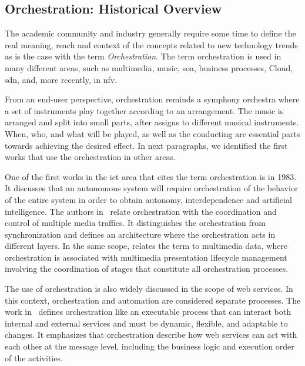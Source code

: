 \subsection{Orchestration: Historical Overview}



The academic community and industry generally require some time to define the real meaning, reach and context of the concepts related to new technology trends as is the case with the term \textit{Orchestration}. 
The term orchestration is used in many different areas, such as multimedia, music, \gls{soa}, business processes, Cloud, \gls{sdn}, and, more recently, in \gls{nfv}.


From an end-user perspective, orchestration reminds a symphony orchestra where a set of instruments play together according to an arrangement. The music is arranged and split into small parts, after assigns to different musical instruments. When, who, and what will be played, as well as the conducting are essential parts towards achieving the desired effect. In next paragraphs, we identified the first works that use the orchestration in other areas. 

One of the first works in the \gls{ict} area that cites the term orchestration is \cite{Anderson1983} in 1983. It discusses that an autonomous system will require orchestration of the behavior of the entire system in order to obtain autonomy, interdependence and artificial intelligence. The authors in~\cite{Campbell1992} relate orchestration with the coordination and control of multiple media traffics. It distinguishes the orchestration from synchronization and defines an architecture where the orchestration acts in different layers. In the same scope, \cite{Robbins1997ImplementationArchitecture} relates the term to multimedia data, where orchestration is associated with multimedia presentation lifecycle management involving the coordination of stages that constitute all orchestration processes. 

The use of orchestration is also widely discussed in the scope of web services. In this context, orchestration and automation are considered separate processes. The work in~\cite{Peltz2003WebChoreography} defines orchestration like an executable process that can interact both internal and external services and must be dynamic, flexible, and adaptable to changes. It emphasizes that orchestration describe how web services can act with each other at the message level, including the business logic and execution order of the activities. 

